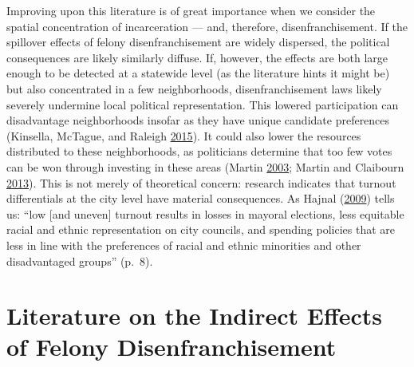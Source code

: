 \documentclass[
  12pt,
]{article}
\begin{document}
Improving upon this literature is of great importance when we consider the spatial concentration of incarceration --- and, therefore, disenfranchisement. If the spillover effects of felony disenfranchisement are widely dispersed, the political consequences are likely similarly diffuse. If, however, the effects are both large enough to be detected at a statewide level (as the literature hints it might be) but also concentrated in a few neighborhoods, disenfranchisement laws likely severely undermine local political representation. This lowered participation can disadvantage neighborhoods insofar as they have unique candidate preferences (Kinsella, McTague, and Raleigh \protect\hyperlink{ref-Kinsella2015}{2015}). It could also lower the resources distributed to these neighborhoods, as politicians determine that too few votes can be won through investing in these areas (Martin \protect\hyperlink{ref-Martin2003}{2003}; Martin and Claibourn \protect\hyperlink{ref-Martin2013}{2013}). This is not merely of theoretical concern: research indicates that turnout differentials at the city level have material consequences. As Hajnal (\protect\hyperlink{ref-Hajnal2009}{2009}) tells us: ``low {[}and uneven{]} turnout results in losses in mayoral elections, less equitable racial and ethnic representation on city councils, and spending policies that are less in line with the preferences of racial and ethnic minorities and other disadvantaged groups'' (p.~8).

\hypertarget{literature-on-the-indirect-effects-of-felony-disenfranchisement}{%
\section*{Literature on the Indirect Effects of Felony Disenfranchisement}\label{literature-on-the-indirect-effects-of-felony-disenfranchisement}}
\end{document}
